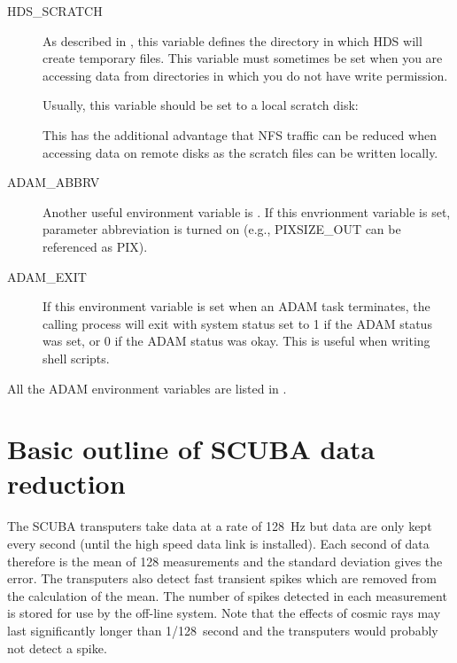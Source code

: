 \documentclass[twoside,11pt]{starlink}
\begin{document}
\begin{description}
\item[HDS\_SCRATCH] \mbox{}

As described in
, this variable defines the directory in
which HDS will create temporary files. This variable must sometimes be set
when you are accessing data from directories in which you do not have write
permission.

Usually, this variable should be set to a local scratch disk:
\begin{terminalv}
\end{terminalv}
This has the additional advantage that NFS traffic can be reduced when
accessing data on remote disks as the scratch files can be written locally.

\item[ADAM\_ABBRV] \mbox{}

Another useful environment variable is
. If this envrionment
variable is set, parameter abbreviation is turned on (e.g., PIXSIZE\_OUT
can be referenced as PIX).

\item[ADAM\_EXIT] \mbox{}

If this environment variable is set when an ADAM task terminates, the calling
process will exit with system status set to 1 if the ADAM status was set, or 0
if the ADAM status was okay. This is useful when writing shell scripts.

\end{description}

All the ADAM environment variables are listed in
 \cite{adam}.

\section{Basic outline of SCUBA data reduction\label{outline}}

The SCUBA transputers take data at a rate of 128~Hz but data are only kept
every second (until the high speed data link is installed). Each second of
data therefore is the mean of 128 measurements and the standard deviation
gives the error. The transputers also detect fast transient spikes which are
removed from the calculation of the mean. The number of spikes detected in
each measurement is stored for use by the off-line system. Note that the
effects of cosmic rays may last significantly longer than 1/128~second and the
transputers would probably not detect a spike.
\end{document}
